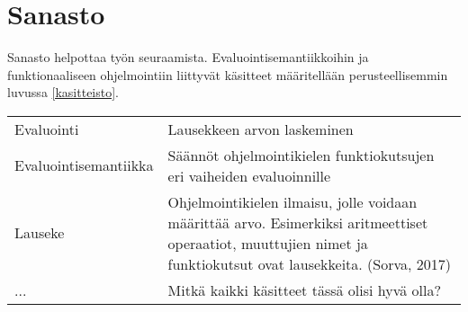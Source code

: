 \section*{Sanasto}

Sanasto helpottaa työn seuraamista. Evaluointisemantiikkoihin ja funktionaaliseen ohjelmointiin liittyvät käsitteet määritellään perusteellisemmin luvussa \ref{kasitteisto}.

\begin{longtable}{@{}p{}p{}@{}}
Evaluointi & Lausekkeen arvon laskeminen \\
Evaluointisemantiikka & Säännöt ohjelmointikielen funktiokutsujen eri vaiheiden evaluoinnille \\
Lauseke & Ohjelmointikielen ilmaisu, jolle voidaan määrittää arvo. Esimerkiksi aritmeettiset operaatiot, muuttujien nimet ja funktiokutsut ovat lausekkeita. (Sorva, 2017) \\
... & Mitkä kaikki käsitteet tässä olisi hyvä olla?
\end{longtable}
